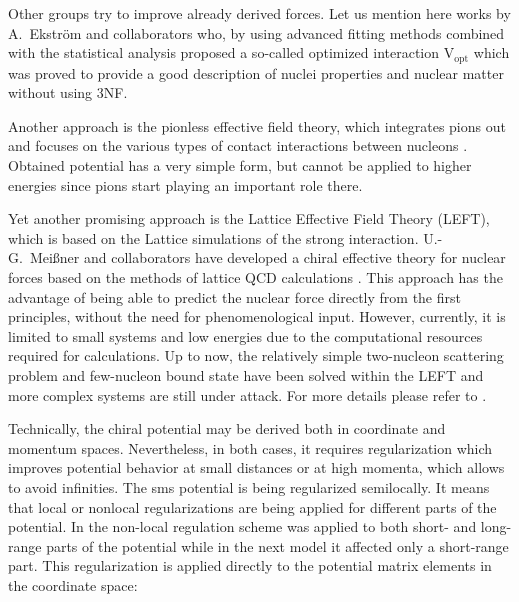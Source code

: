 Other groups try to improve already derived forces.
Let us mention here works by A.~Ekstr\"om and
collaborators \cite{ekstrom_2015, Tews_2020} who,
by using advanced fitting methods combined with
the statistical analysis proposed a so-called optimized interaction
V$_\text{opt}$ which was proved to provide a good description
of nuclei properties and nuclear matter without using 3NF.


Another approach is the pionless effective field
theory, which integrates pions out and
focuses on the various types of contact
interactions between nucleons \cite{hammer_review}.
Obtained potential has a very simple form, but cannot be applied
to higher energies since pions start playing an important role
there.

Yet another promising approach is the Lattice Effective Field Theory (LEFT), which
is based on the Lattice simulations of the strong
interaction. U.-G.~Mei\ss{}ner and collaborators have developed a chiral effective
theory for nuclear forces based on the methods of lattice QCD
calculations \cite{Lande2019}. This approach has the advantage of being able
to predict the nuclear force directly from the first
principles, without the need for phenomenological input. However, currently, it is limited
to small systems and low energies due to the computational
resources required for calculations.
Up to now, the relatively simple two-nucleon scattering problem
and few-nucleon bound state
have been solved within the LEFT and more complex systems are
still under attack. 
For more details please refer to
\cite{Lande2019}.




Technically, the chiral potential may be derived both in coordinate and momentum spaces.
Nevertheless, in both cases, it requires regularization which 
improves potential behavior at small distances or at high momenta,
which allows to avoid infinities. 
The \gls{sms} potential is being regularized semilocally. 
It means that  local or nonlocal regularizations
are being applied for different parts of the potential.
In \cite{Entem2003, epelbaum2005two} the non-local regulation scheme 
was applied to both short- and long-range parts
 of the potential while in the next model \cite{Entem2017, Epelbaum2014SCS}
 it affected only a short-range part. 
This regularization is applied directly to the potential matrix elements 
in the coordinate space:

